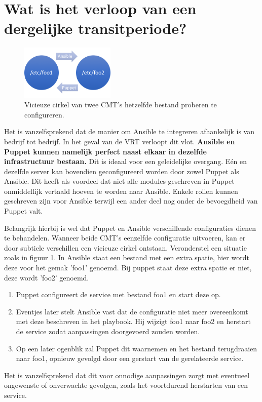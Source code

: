 \section{Wat is het verloop van een dergelijke transitperiode?}
\label{sec:methodologie-verloop-transit}



\begin{figure}
\centering
\includegraphics[width=0.4\textwidth]{img/vicieuzecirkel.PNG}
\caption{\label{fig:vicieuzecirkel}Vicieuze cirkel van twee \gls{CMT}'s hetzelfde bestand proberen te configureren.}
\end{figure}

Het is vanzelfsprekend dat de manier om Ansible te integreren afhankelijk is van bedrijf tot bedrijf. In het geval van de VRT verloopt dit vlot. \textbf{Ansible en Puppet kunnen namelijk perfect naast elkaar in dezelfde infrastructuur bestaan.} Dit is ideaal voor een geleidelijke overgang. E\'en en dezelfde server kan bovendien geconfigureerd worden door zowel Puppet als Ansible. Dit heeft als voordeel dat niet alle modules geschreven in Puppet onmiddellijk vertaald hoeven te worden naar Ansible. Enkele rollen kunnen geschreven zijn voor Ansible terwijl een ander deel nog onder de bevoegdheid van Puppet valt.

 Belangrijk hierbij is wel dat Puppet en Ansible verschillende configuraties dienen te behandelen. Wanneer beide \gls{CMT}'s eenzelfde configuratie uitvoeren, kan er door subtiele verschillen een vicieuze cirkel ontstaan.
Veronderstel een situatie zoals in figuur \ref{fig:vicieuzecirkel}. In Ansible staat een bestand met een extra spatie, hier wordt deze voor het gemak 'foo1' genoemd. Bij puppet staat deze extra spatie er niet, deze wordt 'foo2' genoemd. 
\begin{enumerate}
\item Puppet configureert de service met bestand foo1 en start deze op.
\item  Eventjes later stelt Ansible vast dat de configuratie niet meer overeenkomt met deze beschreven in het playbook. Hij wijzigt foo1 naar foo2 en herstart de service zodat aanpassingen doorgevoerd zouden worden.
\item  Op een later ogenblik zal Puppet dit waarnemen en het bestand terugdraaien naar foo1, opnieuw gevolgd door een gerstart van de gerelateerde service.
\end{enumerate}
Het is vanzelfsprekend dat dit voor onnodige aanpassingen zorgt met eventueel ongewenste of onverwachte gevolgen, zoals het voortdurend herstarten van een service.

